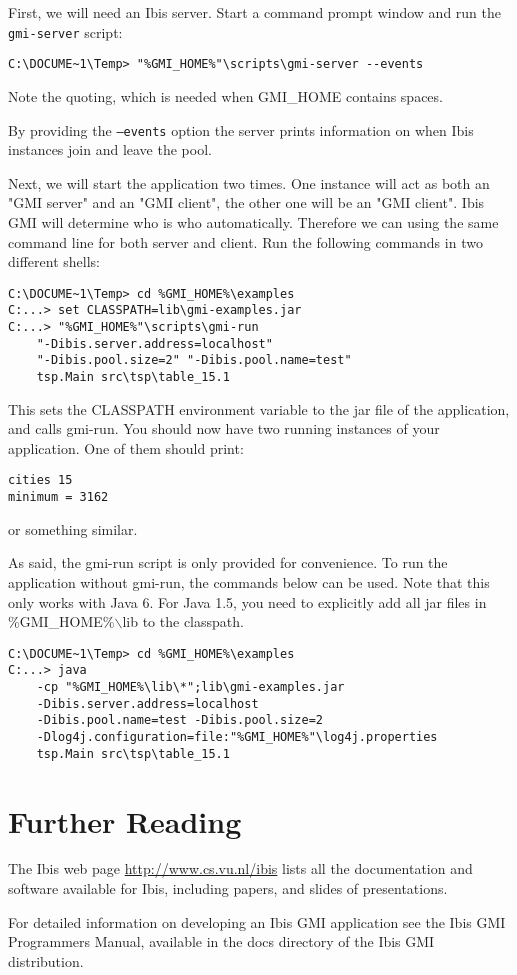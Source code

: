 \documentclass[a4paper,10pt]{article}
\begin{document}
First, we will need an Ibis server. Start a command prompt window and
run the \texttt{gmi-server} script:
\noindent
{\small
\begin{verbatim}
C:\DOCUME~1\Temp> "%GMI_HOME%"\scripts\gmi-server --events
\end{verbatim}
}
\noindent

Note the quoting, which is needed when GMI\_HOME contains spaces.

By providing the \texttt{--events} option the server
prints information on when Ibis instances join and leave the pool.

Next, we will start the application two times. One instance will act as both an
"GMI server" and an "GMI client", the other one will be an "GMI client".
Ibis GMI will determine who is who automatically. Therefore we can using the
same command line for both server and client.
Run the following commands in two different shells:

\noindent
{\small
\begin{verbatim}
C:\DOCUME~1\Temp> cd %GMI_HOME%\examples
C:...> set CLASSPATH=lib\gmi-examples.jar
C:...> "%GMI_HOME%"\scripts\gmi-run
    "-Dibis.server.address=localhost"
    "-Dibis.pool.size=2" "-Dibis.pool.name=test"
    tsp.Main src\tsp\table_15.1
\end{verbatim}
}
\noindent

This sets the CLASSPATH environment variable to the jar file of the
application, and calls gmi-run. You should now have two running
instances of your application. One of them should print:

\noindent
{\small
\begin{verbatim}
cities 15
minimum = 3162
\end{verbatim}
}
\noindent

or something similar.

As said, the gmi-run script is only provided for convenience. To run
the application without gmi-run, the commands below can be used.
Note that this only works with Java 6. For Java 1.5, you need to
explicitly add all jar files in \%GMI\_HOME\%$\backslash$lib to the classpath.

\noindent
{\small
\begin{verbatim}
C:\DOCUME~1\Temp> cd %GMI_HOME%\examples
C:...> java
    -cp "%GMI_HOME%\lib\*";lib\gmi-examples.jar
    -Dibis.server.address=localhost
    -Dibis.pool.name=test -Dibis.pool.size=2
    -Dlog4j.configuration=file:"%GMI_HOME%"\log4j.properties
    tsp.Main src\tsp\table_15.1
\end{verbatim}
}
\noindent

\section{Further Reading}

The Ibis web page \url{http://www.cs.vu.nl/ibis} lists all
the documentation and software available for Ibis, including papers, and
slides of presentations.

For detailed information on developing an Ibis GMI application see the
Ibis GMI Programmers Manual, available in the docs directory of the Ibis GMI
distribution.
\end{document}

